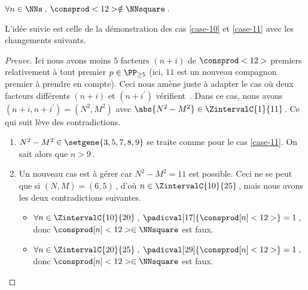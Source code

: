 \begin{fact} \label{case-12}
	 $\forall n \in \NNs$\,, $\consprod<12> \notin \NNsquare$\,.
\end{fact}




L'idée suivie est celle de la démonstration des cas \ref{case-10} et \ref{case-11} avec les changements suivants.


\begin{proof}[Preuve]%
    Ici nous avons moins $5$ facteurs $(n + i)$ de $\consprod<12>$ premiers relativement à tout premier $p \in \PP_{\geq 5}$ (ici, $11$ est un nouveau compagnon premier à prendre en compte).
    Ceci nous amène juste à adapter le cas où deux facteurs différents $(n+i)$ et $(n+i^\prime)$ vérifient \,.
    Dans ce cas, nous avons $(n+i, n+i^\prime) = (N^2, M^2)$ avec $\abs{N^2 - M^2} \in \ZintervalC{1}{11}$\,. Ce qui suit lève des contradictions.
	\begin{enumerate}
		\item $N^2 - M^2 \in \setgene{3, 5, 7, 8, 9}$ se traite comme pour le cas \ref{case-11}. On sait alors que $n > 9$\,.

			
		\item Un nouveau cas est à gérer car $N^2 - M^2 = 11$ est possible.
		Ceci ne se peut que si $(N, M) = (6, 5)$\,, d'où $n \in \ZintervalC{10}{25}$\,, mais nous avons les deux contradictions suivantes.
		\begin{itemize}
			\item $\forall n \in \ZintervalC{10}{20}$\,, 
			$\padicval[17]{\consprod[n]<12>} = 1$\,, donc $\consprod[n]<12> \in \NNsquare$ est faux.

			\item $\forall n \in \ZintervalC{20}{25}$\,, 
			$\padicval[29]{\consprod[n]<12>} = 1$\,, donc $\consprod[n]<12> \in \NNsquare$ est faux.
		\qedhere
		\end{itemize}
	\end{enumerate}
\end{proof}

